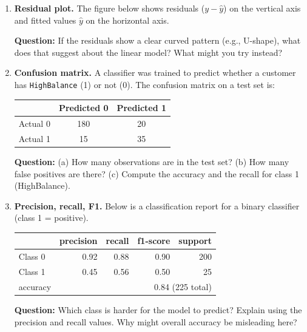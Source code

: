 \documentclass[11pt]{article}
\begin{document}
\begin{enumerate}[leftmargin=*, resume]
\item \textbf{Residual plot.} The figure below shows residuals ($y - \hat{y}$) on the vertical axis and fitted values $\hat{y}$ on the horizontal axis.
\begin{center}
\end{center}
\textbf{Question:} If the residuals show a clear curved pattern (e.g., U-shape), what does that suggest about the linear model? What might you try instead?

\item \textbf{Confusion matrix.} A classifier was trained to predict whether a customer has \texttt{HighBalance} (1) or not (0). The confusion matrix on a test set is:
\begin{center}
\begin{tabular}{l|cc}
 & Predicted 0 & Predicted 1 \\
\midrule
Actual 0 & 180 & 20 \\
Actual 1 & 15 & 35 \\
\end{tabular}
\end{center}
\textbf{Question:} (a) How many observations are in the test set? (b) How many false positives are there? (c) Compute the accuracy and the recall for class 1 (HighBalance).

\item \textbf{Precision, recall, F1.} Below is a classification report for a binary classifier (class 1 = positive).
\begin{center}
\begin{tabular}{lrrrr}
\toprule
 & precision & recall & f1-score & support \\
\midrule
Class 0 & 0.92 & 0.88 & 0.90 & 200 \\
Class 1 & 0.45 & 0.56 & 0.50 & 25 \\
\midrule
accuracy & \multicolumn{4}{r}{0.84 \quad (225 total)} \\
\bottomrule
\end{tabular}
\end{center}
\textbf{Question:} Which class is harder for the model to predict? Explain using the precision and recall values. Why might overall accuracy be misleading here?


\end{enumerate}
\end{document}
